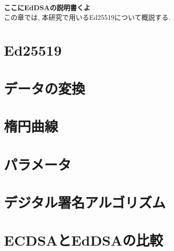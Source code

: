 \textbf{ここにEdDSAの説明書くよ}\\
この章では, 本研究で用いるEd25519について概説する.
\section{Ed25519}

\section{データの変換}

\section{楕円曲線}

\section{パラメータ}

\section{デジタル署名アルゴリズム}

\section{ECDSAとEdDSAの比較}
